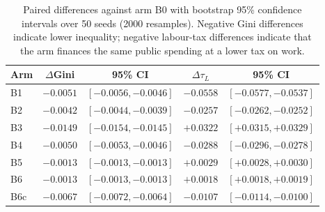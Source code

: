 \begin{table}[!t]
\centering
\caption{Paired differences against arm B0 with bootstrap 95\% confidence intervals over 50 seeds (2000 resamples). Negative Gini differences indicate lower inequality; negative labour-tax differences indicate that the arm finances the same public spending at a lower tax on work.}
\label{tab:ci}
\footnotesize
\begin{tabular}{@{}l c c c c@{}}
\toprule
\textbf{Arm} & $\Delta$\textbf{Gini} & \textbf{95\% CI} & $\Delta\tau_L$ & \textbf{95\% CI} \\
\midrule
B1 & $-0.0051$ & $[-0.0056, -0.0046]$ & $-0.0558$ & $[-0.0577, -0.0537]$ \\
B2 & $-0.0042$ & $[-0.0044, -0.0039]$ & $-0.0257$ & $[-0.0262, -0.0252]$ \\
B3 & $-0.0149$ & $[-0.0154, -0.0145]$ & $+0.0322$ & $[+0.0315, +0.0329]$ \\
B4 & $-0.0050$ & $[-0.0053, -0.0046]$ & $-0.0288$ & $[-0.0296, -0.0278]$ \\
B5 & $-0.0013$ & $[-0.0013, -0.0013]$ & $+0.0029$ & $[+0.0028, +0.0030]$ \\
B6 & $-0.0013$ & $[-0.0013, -0.0013]$ & $+0.0018$ & $[+0.0018, +0.0019]$ \\
B6c & $-0.0067$ & $[-0.0072, -0.0064]$ & $-0.0107$ & $[-0.0114, -0.0100]$ \\
\bottomrule
\end{tabular}
\end{table}
